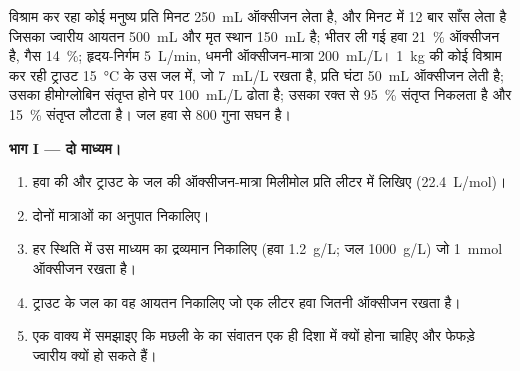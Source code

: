 \begin{problem}
\label{pb:b1:gas-exchange:1}
विश्राम कर रहा कोई मनुष्य प्रति मिनट \qty{250}{mL} ऑक्सीजन लेता है, और
मिनट में \qty{12}{} बार साँस लेता है जिसका ज्वारीय आयतन \qty{500}{mL} और
मृत स्थान \qty{150}{mL} है; भीतर ली गई हवा \qty{21}{\%} ऑक्सीजन है,
 गैस \qty{14}{\%}; हृदय-निर्गम \qty{5}{L/min}, धमनी
ऑक्सीजन-मात्रा \qty{200}{mL/L}। \qty{1}{kg} की कोई विश्राम कर रही ट्राउट
\qty{15}{\celsius} के उस जल में, जो \qty{7}{mL/L} रखता है, प्रति घंटा
\qty{50}{mL} ऑक्सीजन लेती है; उसका हीमोग्लोबिन संतृप्त होने पर
\qty{100}{mL/L} ढोता है; उसका रक्त  से \qty{95}{\%} संतृप्त निकलता
है और \qty{15}{\%} संतृप्त लौटता है। जल हवा से \qty{800}{} गुना सघन है।

\medskip
\noindent\textbf{भाग I --- दो माध्यम।}
\begin{enumerate}
  \item हवा की और ट्राउट के जल की ऑक्सीजन-मात्रा मिलीमोल प्रति लीटर में
        लिखिए (\qty{22.4}{L/mol})।
  \item दोनों मात्राओं का अनुपात निकालिए।
  \item हर स्थिति में उस माध्यम का द्रव्यमान निकालिए (हवा \qty{1.2}{g/L};
        जल \qty{1000}{g/L}) जो \qty{1}{mmol} ऑक्सीजन रखता है।
  \item ट्राउट के जल का वह आयतन निकालिए जो एक लीटर हवा जितनी ऑक्सीजन
        रखता है।
  \item एक वाक्य में समझाइए कि मछली के  का संवातन एक ही दिशा में
        क्यों होना चाहिए और फेफड़े ज्वारीय क्यों हो सकते हैं।
\end{enumerate}


\end{problem}
